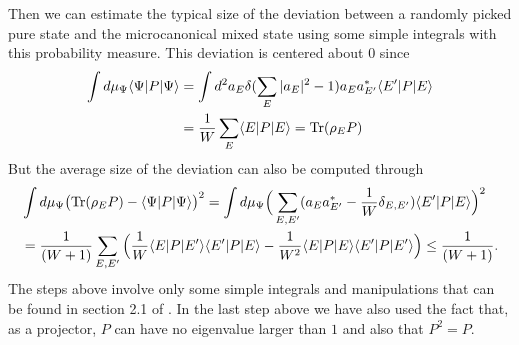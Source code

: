\documentclass[12pt]{article}
\def\tr{{\rm Tr}}
\newcommand{\be}{\begin{equation}}
\newcommand{\ee}{\end{equation}}
\begin{document}
Then we can estimate the typical size of the deviation between a randomly picked pure state and the microcanonical mixed state using some simple integrals with this probability measure. This deviation is centered about $0$ since
\be
\begin{split}
\int d \mu_{\Psi} \langle \Psi | P | \Psi \rangle &= \int d^2 a_{E} \delta(\sum_{E} |a_{E}|^2 - 1) a_{E} a^*_{E'} \langle E' | P | E \rangle  \\
&= {1 \over W} \sum_{E} \langle E | P | E \rangle = \tr(\rho_{E} P)
\end{split}
\ee
But the average size of the deviation can also be computed through
\be
\label{projectordeviation}
\begin{split}
&\int d \mu_{\Psi} \big( \tr(\rho_{E} P) - \langle \Psi | P | \Psi \rangle \big)^2 = \int d \mu_{\Psi} \Big( \sum_{E, E'} (a_{E} a^*_{E'} - {1 \over W} \delta_{E, E'})  \langle E' | P | E \rangle \Big)^2 \\ &=  {1 \over (W + 1)} \sum_{E,E'} \Big( {1 \over W} \langle E | P | E' \rangle \langle E' | P | E \rangle - {1 \over W^2} \langle E | P | E \rangle \langle E' | P | E' \rangle \Big)   \leq {1 \over ( W + 1)}.
\end{split}
\ee
The steps above involve only some simple integrals and manipulations that can be found in section 2.1 of \cite{Raju:2018xue}.  In the last step above we have also used the fact that, as a projector, $P$ can have no eigenvalue larger than $1$ and also that $P^2=P$.
\end{document}
